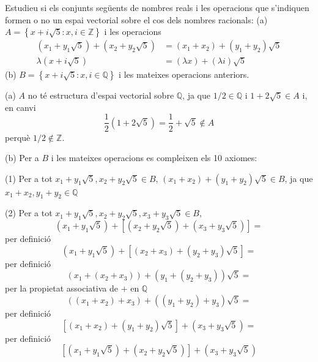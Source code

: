 \bigskip

\begin{exercici}
Estudieu si els conjunts següents de nombres reals i les operacions
que s’indiquen formen o no un espai vectorial sobre el cos dels nombres racionals: (a) $A=\left\{ x+i\sqrt{5}:x,i\in \mathbb{Z}\right\} $ i
les operacions%
\begin{align*}
(x_{1}+y_{1}\sqrt{5})+(x_{2}+y_{2}\sqrt{5}) &=(x_{1}+x_{2})+(y_{1}+y_{2})%
\sqrt{5} \\
\lambda (x+i\sqrt{5}) &=\left( \lambda x\right) +\left( \lambda i\right)
\sqrt{5}
\end{align*}%
(b) $B=\left\{ x+i\sqrt{5}:x,i\in \mathbb{Q}\right\} $ i les mateixes
operacions anteriors.

\end{exercici}
\begin{solucio}
(a) $A$ no té estructura d’espai vectorial sobre $\mathbb{Q}$, ja que $%
1/2\in \mathbb{Q}$ i $1+2\sqrt{5}\in A$ i, en canvi%
\begin{equation*}
\frac{1}{2}\left( 1+2\sqrt{5}\right) =\frac{1}{2}+\sqrt{5}\notin A
\end{equation*}%
perquè $1/2\notin \mathbb{Z}$.

(b) Per a $B$ i les mateixes operacions es compleixen els 10 axiomes:

(1) Per a tot $x_{1}+y_{1}\sqrt{5},x_{2}+y_{2}\sqrt{5}\in B$, $%
(x_{1}+x_{2})+(y_{1}+y_{2})\sqrt{5}\in B$, ja que $x_{1}+x_{2},y_{1}+y_{2}%
\in \mathbb{Q}$

(2) Per a tot $x_{1}+y_{1}\sqrt{5},x_{2}+y_{2}\sqrt{5},x_{3}+y_{3}\sqrt{5}%
\in B$,
\begin{equation*}
\left( x_{1}+y_{1}\sqrt{5}\right) +\left[ \left( x_{2}+y_{2}\sqrt{5}\right)
+\left( x_{3}+y_{3}\sqrt{5}\right) \right] =
\end{equation*}%
per definició%
\begin{equation*}
\left( x_{1}+y_{1}\sqrt{5}\right) +\left[ (x_{2}+x_{3})+(y_{2}+y_{3})\sqrt{5}%
\right] =
\end{equation*}%
per definició%
\begin{equation*}
(x_{1}+\left( x_{2}+x_{3}\right) )+(y_{1}+\left( y_{2}+y_{3}\right) )\sqrt{5}%
=
\end{equation*}%
per la propietat associativa de $+$ en $\mathbb{Q}$%
\begin{equation*}
(\left( x_{1}+x_{2}\right) +x_{3})+(\left( y_{1}+y_{2}\right) +y_{3})\sqrt{5}%
=
\end{equation*}%
per definició%
\begin{equation*}
\left[ \left( x_{1}+x_{2}\right) +\left( y_{1}+y_{2}\right) \sqrt{5}\right]
+\left( x_{3}+y_{3}\sqrt{5}\right) =
\end{equation*}%
per definició%
\begin{equation*}
\left[ \left( x_{1}+y_{1}\sqrt{5}\right) +\left( x_{2}+y_{2}\sqrt{5}\right) %
\right] +\left( x_{3}+y_{3}\sqrt{5}\right)
\end{equation*}


\end{solucio}

